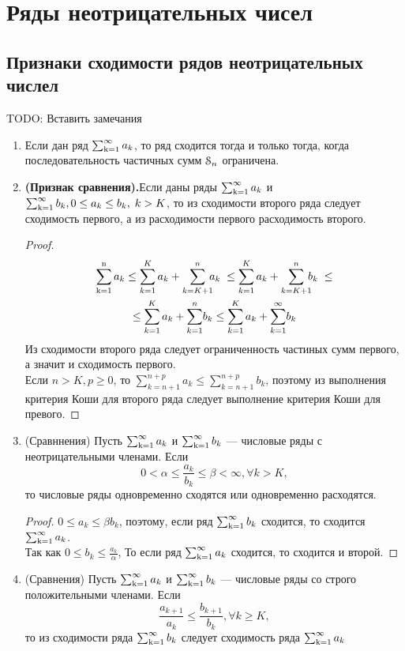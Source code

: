   \chapter{Ряды неотрицательных чисел}
\section*{Признаки сходимости рядов неотрицательных числел}
TODO: Вставить замечания
\begin{enumerate}
\item
Если дан ряд $\operatorname{\sum_{k=1}^{\infty}} a_k$, то ряд сходится тогда и только тогда, когда последовательность частичных сумм $\operatorname{\EuScript{S}}_n$ ограничена.
\item
\textbf{(Признак сравнения).}Если даны  ряды $\operatorname{\sum_{k=1}^{\infty}} a_k $ и $\operatorname{\sum_{k=1}^{\infty}} b_k , 0 \le a_k \le b_k,\; k> K$, то из сходимости второго ряда следует сходимость первого, а из расходимости первого расходимость второго.
\begin{proof}
\begin{multline*}
\ssumn a_k \le \sum_{k=1}^{K} a_k + \sum_{k=K+1}^{n}\!\!\! a_k \; \le \sum_{k=1}^{K} a_k + {\sum_{k=K+1}^{n} \!\!\! b_k}\; \le \\
\le \sum_{k=1}^{K}a_k + \sum_{k=1}^n\! b_k \le \sum_{k=1}^{K}a_k +\sum_{k=1}^{\infty}\! b_k
\end{multline*}
Из сходимости второго ряда следует ограниченность частиных сумм первого, а значит и сходимость первого.\\
Если $n>K, p \ge 0$, то $\sum_{k=n+1}^{n+p}a_k \le \sum_{k=n+1}^{n+p} b_k$, поэтому из выполнения критерия Коши для второго ряда следует выполнение критерия Коши для превого. 
\end{proof}
\item
(Сравннения) Пусть $\operatorname{\sum_{k=1}^{\infty}} a_k $ и $\operatorname{\sum_{k=1}^{\infty}} b_k$ --- числовые ряды с неотрицательными членами. Если $$0 < \alpha \le \frac{a_k}{b_k} \le \beta < \infty, \forall k>K,$$
то числовые ряды одновременно сходятся или одновременно расходятся.
\begin{proof}
$0 \le a_k \le \beta b_k$, поэтому, если ряд $\operatorname{\sum_{k=1}^{\infty}} b_k$ сходится, то сходится $\operatorname{\sum_{k=1}^{\infty}} a_k$.\\
Так как $0 \le b_k \le \frac{a_k}{\alpha}$,
То если ряд $\operatorname{\sum_{k=1}^{\infty}} a_k$ сходится, то сходится и второй.
\end{proof}
\item
(Сравнения) Пусть $\operatorname{\sum_{k=1}^{\infty}} a_k $ и $\operatorname{\sum_{k=1}^{\infty}} b_k$ --- числовые ряды со строго положительными членами. Если
$$ \frac{a_{k+1}}{a_k}\le \frac{b_{k+1}}{b_k}, \forall k \ge K,$$
то из сходимости ряда $\operatorname{\sum_{k=1}^{\infty}} b_k$ следует сходимость ряда $\operatorname{\sum_{k=1}^{\infty}} a_k$

\end{enumerate}
